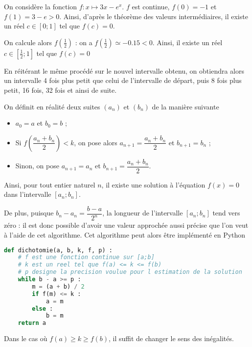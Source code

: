 \documentclass[11pt,fleqn, openany]{book} %
\begin{document}
\begin{example}On considère la fonction $f:x\mapsto 3x-e^x$. $f$ est continue, $f(0)=-1$ et $f(1)=3-e>0$. Ainsi, d'après le théorème des valeurs intermédiaires, il existe un réel $c\in[0;1]$ tel que $f(c)=0$.

On calcule alors $f\left(\frac{1}{2}\right)$ : on a $f\left(\frac{1}{2}\right)\simeq -0.15<0$. Ainsi, il existe un réel $c \in \left[ \frac{1}{2} ; 1 \right]$ tel que $f(c)=0$\end{example}

En réitérant le même procédé sur le nouvel intervalle obtenu, on obtiendra alors un intervalle 4 fois plus petit que celui de l'intervalle de départ, puis 8 fois plus petit, 16 fois, 32 fois et ainsi de suite.

On définit en réalité deux suites $(a_n)$ et $(b_n)$ de la manière suivante
\begin{itemize}
\item $a_0=a$ et $b_0=b$ ;
\item Si $f\left(\dfrac{a_n+b_n}{2}\right) < k$, on pose alors $a_{n+1}=\dfrac{a_n+b_n}{2}$ et $b_{n+1}=b_n$ ;
\item Sinon, on pose $a_{n+1}=a_n$ et $b_{n+1}=\dfrac{a_n+b_n}{2}$.
\end{itemize}

Ainsi, pour tout entier naturel $n$, il existe une solution à l'équation $f(x)=0$ dans l'intervalle $[a_n;b_n]$. 

De plus, puisque $b_n-a_n=\dfrac{b-a}{2^n}$, la longueur de l'intervalle $[a_n;b_n]$ tend vers zéro : il est donc possible d'avoir une valeur approchée aussi précise que l'on veut à l'aide de cet algorithme. Cet algorithme peut alors être implémenté en Python

\begin{lstlisting}[language=python]
def dichotomie(a, b, k, f, p) :
	# f est une fonction continue sur [a;b]
	# k est un reel tel que f(a) <= k <= f(b)
	# p designe la precision voulue pour l estimation de la solution
	while b - a >= p :
		m = (a + b) / 2
		if f(m) <= k :
			a = m
		else :
			b = m
	return a
\end{lstlisting}

Dans le cas où $f(a) \geqslant k \geqslant f(b)$, il suffit de changer le sens des inégalités.
\end{document}
